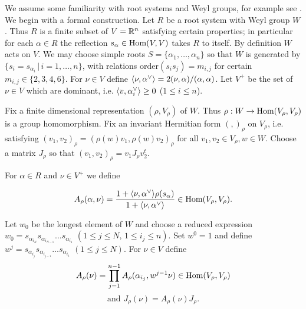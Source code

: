 %
%
%

We assume some familiarity with root systems and Weyl groups, for example see 
\cite{humphreys_coxeter}.
We begin with a formal construction.  Let $R$ be a root system with
Weyl group $W$. Thus $R$ is a finite subset of $V={\mathbb R}^n$ satisfying
certain properties; in particular for each $\alpha\in R$
the reflection $s_\alpha\in \text{Hom}(V,V)$ takes $R$ to itself.  By
definition $W$ acts on $V$. We may choose simple roots
$S=\{\alpha_1,\dots, \alpha_n\}$ so that $W$ is generated by
$\{s_i=s_{\alpha_i}\,|\,i=1,\dots,n\}$, with relations
$\text{order}(s_is_j)=m_{i,j}$ for certain $m_{i,j}\in\{2,3,4,6\}$.
For $\nu\in V$ define $\langle\nu,\alpha^\vee\rangle=2(\nu,\alpha)/(\alpha,\alpha)$. 
Let $V^+$ be the set of $\nu\in V$ which are dominant, i.e.
$\langle v,\alpha^\vee_i\rangle\ge0$ ($1\le i\le n$).

Fix a finite dimensional representation $(\rho,V_\rho)$ of $W$.
Thus $\rho:W\rightarrow \text{Hom}(V_\rho,V_\rho)$ is a group
homomorphism. Fix an invariant Hermitian form $(,)_\rho$ on
$V_\rho$, i.e. satisfying
$(v_1,v_2)_\rho=(\rho(w)v_1,\rho(w)v_2)_\rho$ 
for all $v_1,v_2\in
V_\rho, w\in W$. 
Choose a matrix $J_\rho$ so that $(v_1,v_2)_\rho=v_1J_\rho v_2^t$.


For $\alpha\in R$ and  $\nu\in V^+$ we define 

\begin{equation}
\label{A}
A_\rho(\alpha,\nu)=\frac{1+\langle\nu,\alpha^\vee\rangle\rho(s_{\alpha})}{1+\langle\nu,\alpha^\vee\rangle}
\in\text{Hom}(V_\rho,V_\rho).
\end{equation}



Let $w_0$ be the longest element of $W$ and choose a reduced expression
$w_0=s_{\alpha_{i_N}}s_{\alpha_{i_{N-1}}}\dots s_{\alpha_{i_1}}$
$(1\le j\le N,\,1\le i_j\le n)$.
Set $w^0=1$  and define
$w^j=s_{\alpha_{i_j}}s_{\alpha_{i_{j-1}}}\dots s_{\alpha_{i_1}}$
$(1\le j\le N)$.
For $\nu\in V$ define
$$
A_\rho(\nu)=\prod_{j=1}^{n-1}A_\rho(\alpha_{i_j},w^{j-1}\nu)\in\text{Hom}(V_\rho,V_\rho)
$$
$$
\mbox{and }
J_\rho(\nu)=A_\rho(\nu)J_\rho.
$$

